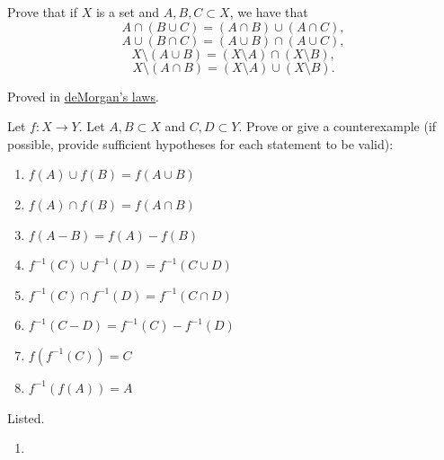   \begin{exercise}
    Prove that if $X$ is a set and $A,B,C \subset X$, we have that
    \begin{equation}
      A \cap (B \cup C) = (A \cap B) \cup (A \cap C),
    \end{equation}
    \begin{equation}
      A \cup (B \cap C) = (A \cup B) \cap (A \cup C),
    \end{equation}
    \begin{equation}
      X \setminus (A \cup B) = (X \setminus A) \cap (X \setminus B),
    \end{equation}
    \begin{equation}
      X \setminus (A \cap B) = (X \setminus A) \cup (X \setminus B).
    \end{equation}
  \end{exercise}
  \begin{solution}
    Proved in \hyperref[thm:demorgan]{deMorgan's laws}. 
  \end{solution}

  \begin{exercise}
    Let $f: X \to Y$. Let $A,B \subset X$ and $C,D \subset Y$. Prove or give a counterexample (if possible, provide sufficient hypotheses for each statement to be valid):
    \begin{enumerate}
      \item $f(A) \cup f(B) = f(A \cup B)$
      \item $f(A) \cap f(B) = f(A \cap B)$
      \item $f(A - B) = f(A) - f(B)$
      \item $f^{-1}(C) \cup f^{-1}(D) = f^{-1}(C \cup D)$
      \item $f^{-1}(C) \cap f^{-1}(D) = f^{-1}(C \cap D)$
      \item $f^{-1}(C - D) = f^{-1}(C) - f^{-1}(D)$
      \item $f(f^{-1}(C)) = C$
      \item $f^{-1}(f(A)) = A$
    \end{enumerate} 
  \end{exercise}
  \begin{solution}
    Listed. 
    \begin{enumerate}
      \item 
    \end{enumerate}
  \end{solution}

